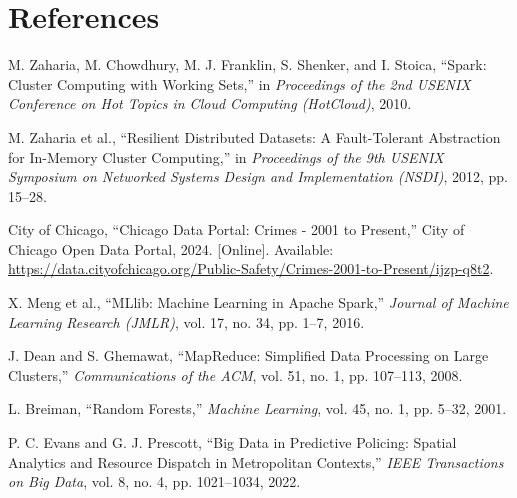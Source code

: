 \documentclass[11pt,a4paper]{article}
\begin{document}
\section*{References}
\begin{enumerate}[label={[\arabic*]}, leftmargin=*]
    \item M. Zaharia, M. Chowdhury, M. J. Franklin, S. Shenker, and I. Stoica, ``Spark: Cluster Computing with Working Sets,'' in \textit{Proceedings of the 2nd USENIX Conference on Hot Topics in Cloud Computing (HotCloud)}, 2010.
    \item M. Zaharia et al., ``Resilient Distributed Datasets: A Fault-Tolerant Abstraction for In-Memory Cluster Computing,'' in \textit{Proceedings of the 9th USENIX Symposium on Networked Systems Design and Implementation (NSDI)}, 2012, pp. 15--28.
    \item City of Chicago, ``Chicago Data Portal: Crimes - 2001 to Present,'' City of Chicago Open Data Portal, 2024. [Online]. Available: \url{https://data.cityofchicago.org/Public-Safety/Crimes-2001-to-Present/ijzp-q8t2}.
    \item X. Meng et al., ``MLlib: Machine Learning in Apache Spark,'' \textit{Journal of Machine Learning Research (JMLR)}, vol. 17, no. 34, pp. 1--7, 2016.
    \item J. Dean and S. Ghemawat, ``MapReduce: Simplified Data Processing on Large Clusters,'' \textit{Communications of the ACM}, vol. 51, no. 1, pp. 107--113, 2008.
    \item L. Breiman, ``Random Forests,'' \textit{Machine Learning}, vol. 45, no. 1, pp. 5--32, 2001.
    \item P. C. Evans and G. J. Prescott, ``Big Data in Predictive Policing: Spatial Analytics and Resource Dispatch in Metropolitan Contexts,'' \textit{IEEE Transactions on Big Data}, vol. 8, no. 4, pp. 1021--1034, 2022.
\end{enumerate}
\end{document}
